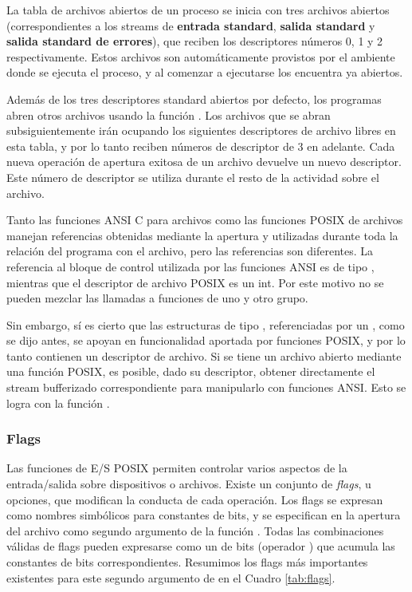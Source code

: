 La tabla de archivos abiertos de un proceso se inicia con tres archivos
abiertos (correspondientes a los streams de \textbf{entrada standard}, \textbf{salida standard} y
\textbf{salida standard de errores}), que reciben los descriptores números 0, 1 y 2
respectivamente. Estos archivos son automáticamente provistos por el ambiente donde se ejecuta el 
proceso, y al comenzar a ejecutarse los encuentra ya abiertos.

Además de los tres descriptores standard abiertos por defecto, los programas abren otros archivos 
usando la función . 
Los archivos que se abran subsiguientemente irán ocupando los
siguientes descriptores de archivo libres en esta tabla, y por lo tanto reciben
números de descriptor de 3 en adelante. Cada nueva operación de apertura exitosa de un
archivo devuelve un nuevo descriptor. Este número de descriptor se utiliza
durante el resto de la actividad sobre el archivo.

Tanto las funciones ANSI C para archivos como las funciones POSIX de archivos
manejan referencias obtenidas mediante la apertura y utilizadas durante toda la
relación del programa con el archivo, pero las referencias son diferentes. La
referencia al bloque de control utilizada por las funciones ANSI es de tipo
, mientras que el descriptor de archivo POSIX es un int. Por este motivo
no se pueden mezclar las llamadas a funciones de uno y otro grupo.

Sin embargo, sí es cierto que las estructuras de tipo , referenciadas por
un , como se dijo antes, se apoyan en funcionalidad aportada por
funciones POSIX, y por lo tanto contienen un descriptor de archivo. Si se tiene
un archivo abierto mediante una función POSIX, es posible, dado su descriptor,
obtener directamente el stream bufferizado correspondiente para manipularlo con
funciones ANSI. Esto se logra con la función .



\subsubsection{Flags}
Las funciones de E/S POSIX permiten controlar varios aspectos de la entrada/salida sobre dispositivos o archivos. Existe un conjunto de \textit{flags}, u opciones, que modifican la conducta de cada operación.   
Los flags se expresan como nombres simbólicos para constantes de bits, y se especifican en la apertura del archivo como segundo argumento de la función . Todas las combinaciones válidas de flags pueden expresarse como un  de bits (operador \code{|}) que acumula las constantes de bits correspondientes. Resumimos los flags más importantes existentes para este segundo argumento de  en el Cuadro \ref{tab:flags}.


